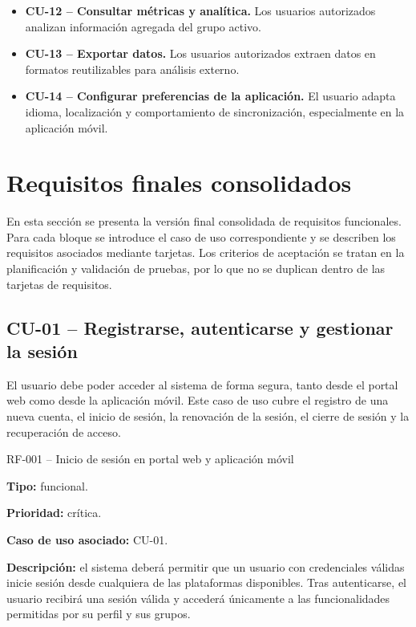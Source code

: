 \begin{itemize}
\item \textbf{CU-12 -- Consultar métricas y analítica.} Los usuarios autorizados
analizan información agregada del grupo activo.

\item \textbf{CU-13 -- Exportar datos.} Los usuarios autorizados extraen datos en
formatos reutilizables para análisis externo.

\item \textbf{CU-14 -- Configurar preferencias de la aplicación.} El usuario
adapta idioma, localización y comportamiento de sincronización, especialmente en
la aplicación móvil.
\end{itemize}

\section{Requisitos finales consolidados}

En esta sección se presenta la versión final consolidada de requisitos
funcionales. Para cada bloque se introduce el caso de uso correspondiente y se
describen los requisitos asociados mediante tarjetas. Los criterios de aceptación
se tratan en la planificación y validación de pruebas, por lo que no se duplican
dentro de las tarjetas de requisitos.

\subsection{CU-01 -- Registrarse, autenticarse y gestionar la sesión}

El usuario debe poder acceder al sistema de forma segura, tanto desde el portal
web como desde la aplicación móvil. Este caso de uso cubre el registro de una
nueva cuenta, el inicio de sesión, la renovación de la sesión, el cierre de
sesión y la recuperación de acceso.

\begin{requisitocard}{RF-001 -- Inicio de sesión en portal web y aplicación móvil}

\textbf{Tipo:} funcional.

\textbf{Prioridad:} crítica.

\textbf{Caso de uso asociado:} CU-01.

\textbf{Descripción:} el sistema deberá permitir que un usuario con credenciales
válidas inicie sesión desde cualquiera de las plataformas disponibles. Tras
autenticarse, el usuario recibirá una sesión válida y accederá únicamente a las
funcionalidades permitidas por su perfil y sus grupos.

\end{requisitocard}

